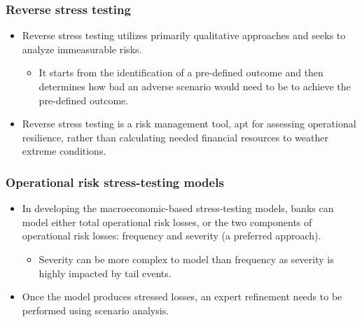\subsubsection{Reverse stress testing}
\begin{itemize}
\item Reverse stress testing utilizes primarily qualitative approaches and seeks to analyze immeasurable risks.
    \begin{itemize}
    \item It starts from the identification of a pre-defined outcome and then determines how bad an adverse scenario would need to be to achieve the pre-defined outcome.
    \end{itemize}
\item Reverse stress testing is a risk management tool, apt for assessing operational resilience, rather than calculating needed financial resources to weather extreme conditions.
\end{itemize}




\subsubsection{Operational risk stress-testing models}
\begin{itemize}
\item In developing the macroeconomic-based stress-testing models, banks can model either total operational risk losses, or the two components of operational risk losses: frequency and severity (a preferred approach).
    \begin{itemize}
    \item Severity can be more complex to model than frequency as severity is highly impacted by tail events.
    \end{itemize}
\item Once the model produces stressed losses, an expert refinement needs to be performed using scenario analysis.
\end{itemize}





